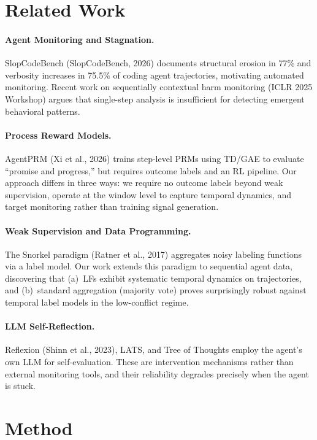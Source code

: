 \documentclass[11pt,a4paper]{article}
\begin{document}
\section{Related Work}

\paragraph{Agent Monitoring and Stagnation.}
SlopCodeBench (SlopCodeBench, 2026) documents structural erosion in 77\% and verbosity increases in 75.5\% of coding agent trajectories, motivating automated monitoring.
Recent work on sequentially contextual harm monitoring (ICLR 2025 Workshop) argues that single-step analysis is insufficient for detecting emergent behavioral patterns.

\paragraph{Process Reward Models.}
AgentPRM (Xi et al., 2026) trains step-level PRMs using TD/GAE to evaluate ``promise and progress,'' but requires outcome labels and an RL pipeline.
Our approach differs in three ways: we require no outcome labels beyond weak supervision, operate at the window level to capture temporal dynamics, and target monitoring rather than training signal generation.

\paragraph{Weak Supervision and Data Programming.}
The Snorkel paradigm (Ratner et al., 2017) aggregates noisy labeling functions via a label model.
Our work extends this paradigm to sequential agent data, discovering that (a)~LFs exhibit systematic temporal dynamics on trajectories, and (b)~standard aggregation (majority vote) proves surprisingly robust against temporal label models in the low-conflict regime.

\paragraph{LLM Self-Reflection.}
Reflexion (Shinn et al., 2023), LATS, and Tree of Thoughts employ the agent's own LLM for self-evaluation.
These are intervention mechanisms rather than external monitoring tools, and their reliability degrades precisely when the agent is stuck.

\section{Method}
\end{document}
